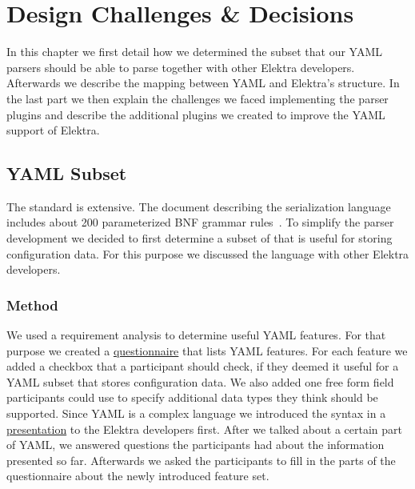 \chapter{Design Challenges \& Decisions}
\label{sec:design_challenges_and_decisions}

In this chapter we first detail how we determined the subset that our YAML parsers should be able to parse together with other Elektra developers. Afterwards we describe the mapping between YAML and Elektra’s  structure. In the last part we then explain the challenges we faced implementing the parser plugins and describe the additional plugins we created to improve the YAML support of Elektra.

\section{YAML Subset}

The  standard is extensive. The document describing the serialization language includes about 200 parameterized \gls{BNF} grammar rules~\cite{ben2009yaml}. To simplify the parser development we decided to first determine a subset of  that is useful for storing configuration data. For this purpose we discussed the language with other Elektra developers.

\subsection{Method}

We used a requirement analysis to determine useful YAML features. For that purpose we created a \href{https://github.com/sanssecours/YAML-Presentation/blob/master/Questionnaire.md}{questionnaire} that lists YAML features. For each feature we added a checkbox that a participant should check, if they deemed it useful for a YAML subset that stores configuration data. We also added one free form field participants could use to specify additional data types they think should be supported. Since YAML is a complex language we introduced the  syntax in a \href{https://github.com/sanssecours/YAML-Presentation/releases/download/v1.0/Presentation.pdf}{presentation} to the Elektra developers first. After we talked about a certain part of YAML, we answered questions the participants had about the information presented so far. Afterwards we asked the participants to fill in the parts of the questionnaire about the newly introduced feature set.

